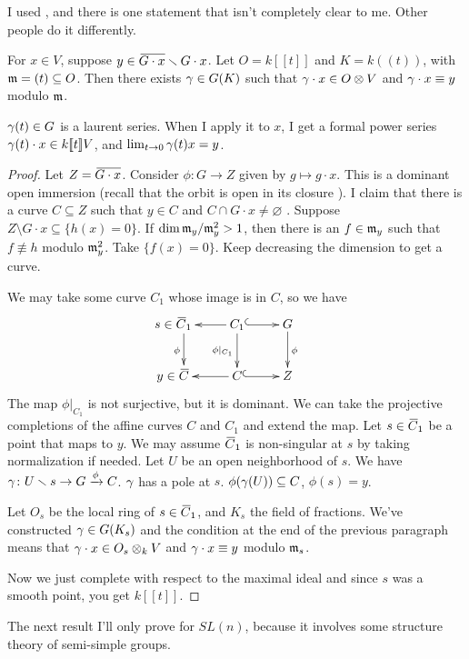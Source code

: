 I used \cite{git}, and there is one statement that isn't completely clear to me. Other people do it differently.
\begin{lemma}
 For $x\in V$, suppose $y\in \bbar{G\cdot x}\setminus G\cdot x$. Let $O=k[\![t]\!]$ and $K=k(\!(t)\!)$, with $\mathfrak{m}=(t)\subseteq O$. Then there exists $\gamma\in G(K)$ such that $\gamma\cdot x\in O\otimes V$ and $\gamma\cdot x\equiv y$ modulo $\mathfrak{m}$.
\end{lemma}
$\gamma(t)\in G$ is a laurent series. When I apply it to $x$, I get a formal power series $\gamma(t)\cdot x\in k[\![t]\!]V$, and $\lim_{t\to 0} \gamma(t)x=y$.
\begin{proof}
 Let $Z=\bbar{G\cdot x}$. Consider $\phi\colon G\to Z$ given by $g\mapsto g\cdot x$. This is a dominant open immersion (recall that the orbit is open in its closure ). I claim that there is a curve $C\subseteq Z$ such that $y\in C$ and $C\cap G\cdot x\neq\varnothing$ . Suppose $Z\setminus G\cdot x\subseteq \{h(x)=0\}$. If $\dim \mathfrak{m}_y/\mathfrak{m}_y^2 >1$, then there is an $f\in \mathfrak{m}_y$ such that $f\not\equiv h$ modulo $\mathfrak{m}_y^2$. Take $\{f(x)=0\}$. Keep decreasing the dimension to get a curve.
 
 We may take some curve $C_1$ whose image is in $C$, so we have
 \[\xymatrix{
  \llap{$s\in\;$}\bbar C_1 \ar[d]_{\phi} & C_1\ar[l]\ar@{^(->}[r]\ar[d]_{\phi|_{C_1}} & G\ar[d]^\phi\\
  \llap{$y\in\;$}\bbar C & C\ar[l]\ar@{^(->}[r] & Z
 }\]
 The map $\phi|_{C_1}$ is not surjective, but it is dominant. We can take the projective completions of the affine curves $C$ and $C_1$ and extend the map. Let $s\in \bbar C_1$ be a point that maps to $y$. We may assume $\bbar C_1$ is non-singular at $s$ by taking normalization if needed. Let $U$ be an open neighborhood of $s$. We have $\gamma\colon U\smallsetminus s\to G\xrightarrow{\phi}C$. $\gamma$ has a pole at $s$. $\phi(\gamma(U))\subseteq C$, $\phi(s)=y$. 

 Let $O_s$ be the local ring of $s\in \bbar C_1$, and $K_s$ the field of fractions. We've constructed $\gamma\in G(K_s)$ and the condition at the end of the previous paragraph means that $\gamma\cdot x\in O_s\otimes_k V$ and $\gamma\cdot x\equiv y$ modulo $\mathfrak{m}_s$.
 
 Now we just complete with respect to the maximal ideal and since $s$ was a smooth point, you get $k[\![t]\!]$.
\end{proof}
The next result I'll only prove for $SL(n)$, because it involves some structure theory of semi-simple groups.
